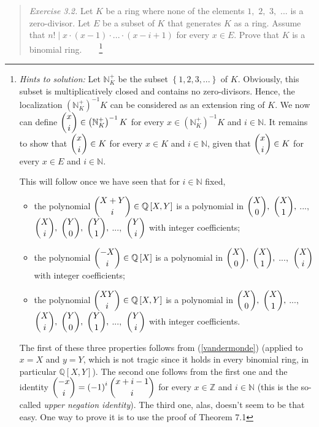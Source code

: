 \documentclass[12pt,final,notitlepage,onecolumn,german]{article}%
\begin{document}
\begin{quotation}
\textit{Exercise 3.2.} Let $K$ be a ring where none of the elements $1,$ $2,$
$3,$ $...$ is a zero-divisor. Let $E$ be a subset of $K$ that generates $K$ as
a ring. Assume that $n!\mid x\cdot\left(  x-1\right)  \cdot...\cdot\left(
x-i+1\right)  $ for every $x\in E$. Prove that $K$ is a binomial
ring.\ \ \ \ \footnote{\textit{Hints to solution:} Let $\mathbb{N}_{K}^{+}$ be
the subset $\left\{  1,2,3,...\right\}  $ of $K$. Obviously, this subset is
multiplicatively closed and contains no zero-divisors. Hence, the localization
$\left(  \mathbb{N}_{K}^{+}\right)  ^{-1}K$ can be considered as an extension
ring of $K$. We now can define $\dbinom{x}{i}\in\left(  \mathbb{N}_{K}%
^{+}\right)  ^{-1}K$ for every $x\in\left(  \mathbb{N}_{K}^{+}\right)  ^{-1}K$
and $i\in\mathbb{N}$. It remains to show that $\dbinom{x}{i}\in K$ for every
$x\in K$ and $i\in\mathbb{N}$, given that $\dbinom{x}{i}\in K$ for every $x\in
E$ and $i\in\mathbb{N}$.
\par
This will follow once we have seen that for $i\in\mathbb{N}$ fixed,
\par
\begin{itemize}
\item the polynomial $\dbinom{X+Y}{i}\in\mathbb{Q}\left[  X,Y\right]  $ is a
polynomial in $\dbinom{X}{0},$ $\dbinom{X}{1},$ $...,$ $\dbinom{X}{i},$
$\dbinom{Y}{0},$ $\dbinom{Y}{1},$ $...,$ $\dbinom{Y}{i}$ with integer
coefficients;
\par
\item the polynomial $\dbinom{-X}{i}\in\mathbb{Q}\left[  X\right]  $ is a
polynomial in $\dbinom{X}{0},$ $\dbinom{X}{1},$ $...,$ $\dbinom{X}{i}$ with
integer coefficients;
\par
\item the polynomial $\dbinom{XY}{i}\in\mathbb{Q}\left[  X,Y\right]  $ is a
polynomial in $\dbinom{X}{0},$ $\dbinom{X}{1},$ $...,$ $\dbinom{X}{i},$
$\dbinom{Y}{0},$ $\dbinom{Y}{1},$ $...,$ $\dbinom{Y}{i}$ with integer
coefficients.
\end{itemize}
\par
The first of these three properties follows from (\ref{vandermonde}) (applied
to $x=X$ and $y=Y$, which is not tragic since it holds in every binomial ring,
in particular $\mathbb{Q}\left[  X,Y\right]  $). The second one follows from
the first one and the identity $\dbinom{-x}{i}=\left(  -1\right)  ^{i}%
\dbinom{x+i-1}{i}$ for every $x\in\mathbb{Z}$ and $i\in\mathbb{N}$ (this is
the so-called \textit{upper negation identity}). The third one, alas, doesn't
seem to be that easy. One way to prove it is to use the proof of Theorem 7.1
}
\end{quotation}
\end{document}
